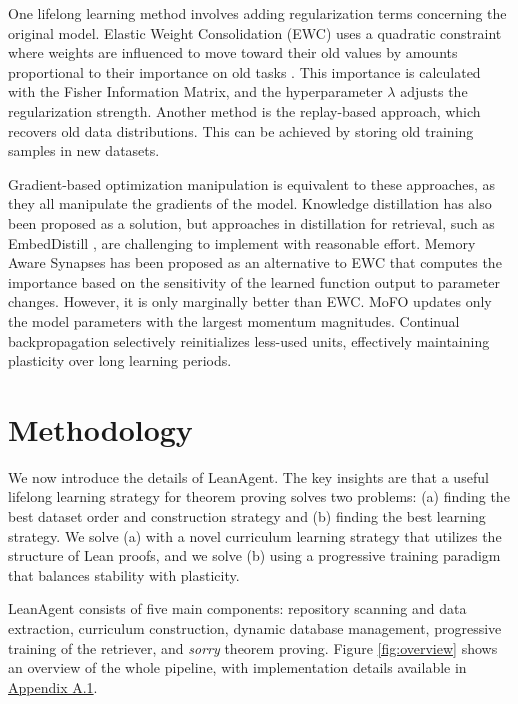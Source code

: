 \documentclass{article} %
\begin{document}
One lifelong learning method involves adding regularization terms concerning the original model. Elastic Weight Consolidation (EWC) uses a quadratic constraint where weights are influenced to move toward their old values by amounts proportional to their importance on old tasks \citep{kirkpatrickOvercomingCatastrophicForgetting2017}. This importance is calculated with the Fisher Information Matrix, and the hyperparameter $\lambda$ adjusts the regularization strength. Another method is the replay-based approach, which recovers old data distributions. This can be achieved by storing old training samples in new datasets.

Gradient-based optimization manipulation is equivalent to these approaches, as they all manipulate the gradients of the model. Knowledge distillation has also been proposed as a solution, but approaches in distillation for retrieval, such as EmbedDistill \citep{kimEmbedDistillGeometricKnowledge2023}, are challenging to implement with reasonable effort. Memory Aware Synapses \citep{aljundiMemoryAwareSynapses2018} has been proposed as an alternative to EWC that computes the importance based on the sensitivity of the learned function output to parameter changes. However, it is only marginally better than EWC. MoFO \citep{chenMoFOMomentumFilteredOptimizer2024} updates only the model parameters with the largest momentum magnitudes. Continual backpropagation \citep{dohareLossPlasticityDeep2024} selectively reinitializes less-used units, effectively maintaining plasticity over long learning periods.

\section{Methodology}
\label{sec:methodology}

We now introduce the details of LeanAgent. The key insights are that a useful lifelong learning strategy for theorem proving solves two problems: (a) finding the best dataset order and construction strategy and (b) finding the best learning strategy. We solve (a) with a novel curriculum learning strategy that utilizes the structure of Lean proofs, and we solve (b) using a progressive training paradigm that balances stability with plasticity.

LeanAgent consists of five main components: repository scanning and data extraction, curriculum construction, dynamic database management, progressive training of the retriever, and \textit{sorry} theorem proving. Figure \ref{fig:overview} shows an overview of the whole pipeline, with implementation details available in \hyperref[sec:implementation_details]{Appendix A.1}.
\end{document}
